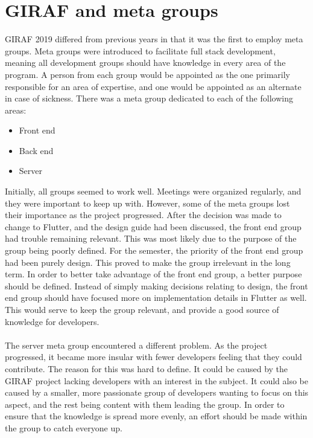 \section{GIRAF and meta groups}
GIRAF 2019 differed from previous years in that it was the first to employ meta groups.
Meta groups were introduced to facilitate full stack development, meaning all development groups should have knowledge in every area of the program.
A person from each group would be appointed as the one primarily responsible for an area of expertise, and one would be appointed as an alternate in case of sickness.
There was a meta group dedicated to each of the following areas:
\begin{itemize}
    \item Front end
    \item Back end
    \item Server
\end{itemize} 
\noindent
Initially, all groups seemed to work well. 
Meetings were organized regularly, and they were important to keep up with.
However, some of the meta groups lost their importance as the project progressed.
After the decision was made to change to Flutter, and the design guide had been discussed, the front end group had trouble remaining relevant.
This was most likely due to the purpose of the group being poorly defined.
For the semester, the priority of the front end group had been purely design.
This proved to make the group irrelevant in the long term.
In order to better take advantage of the front end group, a better purpose should be defined.
Instead of simply making decisions relating to design, the front end group should have focused more on implementation details in Flutter as well.
This would serve to keep the group relevant, and provide a good source of knowledge for developers.
\\\\
The server meta group encountered a different problem.
As the project progressed, it became more insular with fewer developers feeling that they could contribute.
The reason for this was hard to define.
It could be caused by the GIRAF project lacking developers with an interest in the subject.
It could also be caused by a smaller, more passionate group of developers wanting to focus on this aspect, and the rest being content with them leading the group.
In order to ensure that the knowledge is spread more evenly, an effort should be made within the group to catch everyone up.
\\\\
